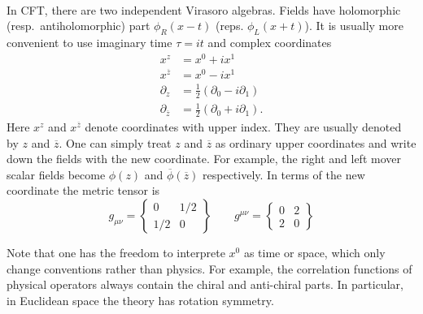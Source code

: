 \documentclass[submission, PhysLectNotes]{SciPost}
\begin{document}
\\
In CFT, there are two independent Virasoro algebras. Fields have holomorphic (resp.\ antiholomorphic) part $\phi_R(x-t)$ (reps. $\phi_L(x+t)$). It is usually more convenient to use imaginary time $\tau = it$ and complex coordinates
\begin{equation}
\begin{aligned}
x^z &= x^0 + i x^1 \\
x^{\overline{z}} &= x^0 - i x^1 \\
\partial_z &= \frac{1}{2} \left( \partial_0 - i\partial_1 \right) \\
\partial_{\overline{z}} &= \frac{1}{2} \left( \partial_0 + i\partial_1 \right).
\end{aligned}
\end{equation}  
Here $x^z$ and $x^{\overline{z}}$ denote coordinates with upper index. They are usually denoted by $z$ and $\overline{z}$. One can simply treat $z$ and $\overline{z}$ as ordinary upper coordinates and write down the fields with the new coordinate. For example, the right and left mover scalar fields become $\phi(z)$ and $\overline{\phi}(\overline{z})$ respectively. In terms of the new coordinate the metric tensor is
\begin{equation}
	g_{\mu\nu} = \begin{Bmatrix}
        0    & 1/2  \\
        1/2  & 0     
    \end{Bmatrix} \qquad
	g^{\mu\nu} = \begin{Bmatrix}
        0 & 2  \\
        2 & 0
    \end{Bmatrix}
\end{equation}

Note that one has the freedom to interprete $x^0$ as time or space, which only change conventions rather than physics. For example, the correlation functions of physical operators always contain the chiral and anti-chiral parts. In particular, in Euclidean space the theory has rotation symmetry. 
\end{document}
